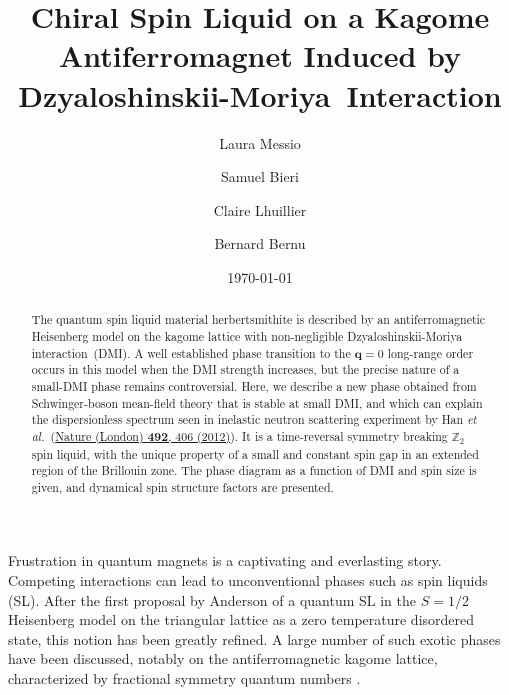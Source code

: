 \documentclass[aps,prl,twocolumn,superscriptaddress,showpacs,a4paper, longbibliography]{revtex4-1}
\newcommand{\DM}{Dzyaloshinskii-Moriya}
\begin{document}
\title{Chiral Spin Liquid on a Kagome Antiferromagnet Induced by \DM\ Interaction}

\author{Laura Messio}

\author{Samuel Bieri}

\author{Claire Lhuillier}

\author{Bernard Bernu}

\date{\today}

\begin{abstract}
  The quantum spin liquid material herbertsmithite is described by an antiferromagnetic Heisenberg model on the kagome lattice with non-negligible Dzyaloshinskii-Moriya interaction~(DMI).
  A well established phase transition to the $\mathbf q=0$ long-range order occurs in this model when the DMI strength increases, but the precise nature of a small-DMI phase remains controversial.
  Here, we describe a new phase obtained from Schwinger-boson mean-field theory that is stable at small DMI, and which can explain the dispersionless spectrum seen in inelastic neutron scattering experiment by Han {\it et al.}~(\href{http://dx.doi.org/10.1038/nature11659}{Nature (London) {\bf 492}, 406 (2012)}).
  It is a time-reversal symmetry breaking $\mathbb Z_2$ spin liquid, with the unique property of a small and constant spin gap in an extended region of the Brillouin zone.
  The phase diagram as a function of DMI and spin size is given, and dynamical spin structure factors are presented.
\end{abstract}


\maketitle

Frustration in quantum magnets is a captivating and everlasting story.
Competing interactions can lead to unconventional phases such as spin liquids (SL).
After the first proposal by Anderson \cite{Anderson} of a quantum SL in the $S=1/2$ Heisenberg model on the triangular lattice as a zero temperature disordered state, this notion has been greatly refined. A large number of such exotic phases have been discussed, notably on the antiferromagnetic kagome lattice, characterized by fractional symmetry quantum numbers \cite{Qi_Fu, Symmetry_fractionalization}.
\end{document}
